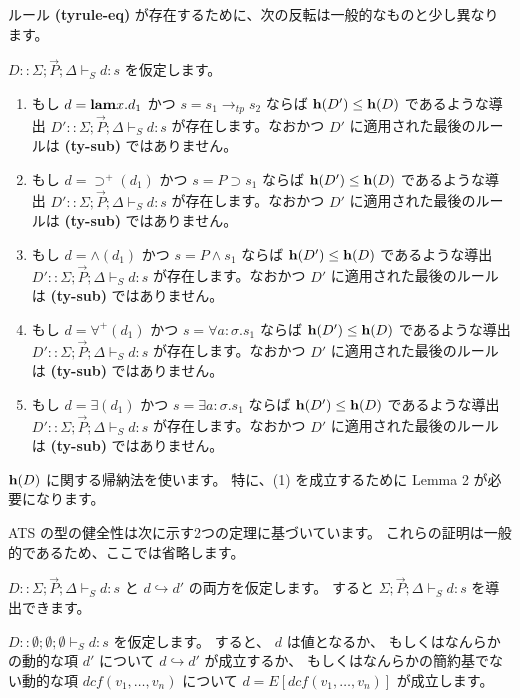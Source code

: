 \documentclass[submit,techreq,noauthor,onecolumn]{ipsj}
\begin{document}
ルール {\bf (tyrule-eq)} が存在するために、次の反転は一般的なものと少し異なります。

$D::\Sigma; \vec{P}; \Delta \vdash_S d:s$ を仮定します。

\begin{enumerate}
  \item もし $d = {\bf lam} x.d_1$ かつ $s = s_1 \rightarrow_{tp} s_2$ ならば ${\bf h}(D') \leq {\bf h}(D)$ であるような導出 $D'::\Sigma; \vec{P}; \Delta \vdash_S d:s$ が存在します。なおかつ $D'$ に適用された最後のルールは {\bf (ty-sub)} ではありません。
  \item もし $d = \supset^+(d_1)$ かつ $s = P \supset s_1$ ならば ${\bf h}(D') \leq {\bf h}(D)$ であるような導出 $D' :: \Sigma; \vec{P}; \Delta \vdash_S d:s$ が存在します。なおかつ $D'$ に適用された最後のルールは {\bf (ty-sub)} ではありません。
  \item もし $d = \wedge(d_1)$ かつ $s = P \wedge s_1$ ならば ${\bf h}(D') \leq {\bf h}(D)$ であるような導出 $D' :: \Sigma; \vec{P}; \Delta \vdash_S d:s$ が存在します。なおかつ $D'$ に適用された最後のルールは {\bf (ty-sub)} ではありません。
  \item もし $d = \forall^+(d_1)$ かつ $s = \forall a:\sigma.s_1$ ならば ${\bf h}(D') \leq {\bf h}(D)$ であるような導出 $D' :: \Sigma; \vec{P}; \Delta \vdash_S d:s$ が存在します。なおかつ $D'$ に適用された最後のルールは {\bf (ty-sub)} ではありません。
  \item もし $d = \exists(d_1)$ かつ $s = \exists a:\sigma.s_1$ ならば ${\bf h}(D') \leq {\bf h}(D)$ であるような導出 $D' :: \Sigma; \vec{P}; \Delta \vdash_S d:s$ が存在します。なおかつ $D'$ に適用された最後のルールは {\bf (ty-sub)} ではありません。
\end{enumerate}

${\bf h}(D)$ に関する帰納法を使います。
特に、(1) を成立するために Lemma 2 が必要になります。

ATS の型の健全性は次に示す2つの定理に基づいています。
これらの証明は一般的であるため、ここでは省略します。

$D :: \Sigma; \vec{P}; \Delta \vdash_S d:s$ と $d \hookrightarrow d'$ の両方を仮定します。
すると $\Sigma; \vec{P}; \Delta \vdash_S d:s$ を導出できます。

$D :: \emptyset;\emptyset;\emptyset \vdash_S d:s$ を仮定します。
すると、 $d$ は値となるか、
もしくはなんらかの動的な項 $d'$ について $d \hookrightarrow d'$ が成立するか、
もしくはなんらかの簡約基でない動的な項 $dcf(v_1,\ldots,v_n)$ について $d = E[dcf(v_1,\ldots,v_n)]$ が成立します。
\end{document}

